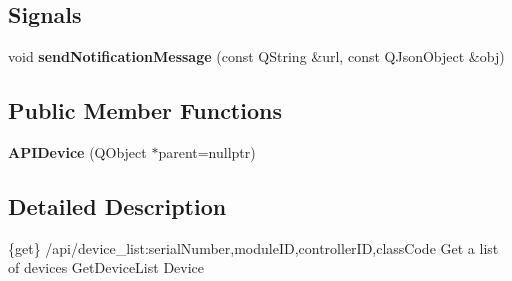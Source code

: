 \subsection*{Signals}
\begin{DoxyCompactItemize}
\item 
\mbox{\label{class_a_p_i_device_a1096381146a1c545b194d4bb63b32b8b}} 
void {\bfseries send\+Notification\+Message} (const Q\+String \&url, const Q\+Json\+Object \&obj)
\end{DoxyCompactItemize}
\subsection*{Public Member Functions}
\begin{DoxyCompactItemize}
\item 
\mbox{\label{class_a_p_i_device_ab983034826edbff2b4246002b22081a5}} 
{\bfseries A\+P\+I\+Device} (Q\+Object $\ast$parent=nullptr)
\end{DoxyCompactItemize}


\subsection{Detailed Description}
\{get\} /api/device\+\_\+list\+:serial\+Number,module\+ID,controller\+ID,class\+Code Get a list of devices  Get\+Device\+List  Device

